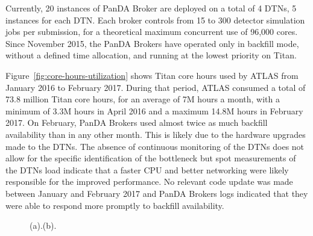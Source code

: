 
Currently, 20 instances of PanDA Broker are deployed on a total of 4 DTNs, 5
instances for each DTN. Each broker controls from 15 to 300 detector simulation
jobs per submission, for a theoretical maximum concurrent use of 96,000
cores. Since November 2015, the PanDA Brokers have operated only in backfill
mode, without a defined time allocation, and running at the lowest priority on
Titan.

Figure~\ref{fig:core-hours-utilization} shows Titan core hours used by ATLAS
from January 2016 to February 2017. During that period, ATLAS consumed a total
of 73.8 million Titan core hours, for an average of 7M hours a month, with a
minimum of 3.3M hours in April 2016 and a maximum 14.8M hours in February 2017.
On February, PanDA Brokers used almost twice as much backfill availability than
in any other month. This is likely due to the hardware upgrades made to the
DTNs. The absence of continuous monitoring of the DTNs does not allow for the
specific identification of the bottleneck but spot measurements of the DTNs load
indicate that a faster CPU and better networking were likely responsible for the
improved performance. No relevant code update was made between January and
February 2017 and PanDA Brokers logs indicated that they were able to respond
more promptly to backfill availability.

\begin{figure}[htp]

\caption{(a).(b).}
\end{figure}

